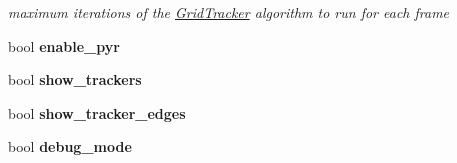 \begin{DoxyCompactItemize}
\begin{DoxyCompactList}\small\item\em maximum iterations of the \hyperlink{classGridTracker}{Grid\-Tracker} algorithm to run for each frame \end{DoxyCompactList}\item 
\hypertarget{structGridTrackerParams_a0516980c61b4f4915e44c54384cc9446}{bool {\bfseries enable\-\_\-pyr}}\label{structGridTrackerParams_a0516980c61b4f4915e44c54384cc9446}

\item 
\hypertarget{structGridTrackerParams_a965b5f1d03e9d7311a2e899ef8d41f13}{bool {\bfseries show\-\_\-trackers}}\label{structGridTrackerParams_a965b5f1d03e9d7311a2e899ef8d41f13}

\item 
\hypertarget{structGridTrackerParams_ae8bd52af8dfc1dc39c6b6247645a72ae}{bool {\bfseries show\-\_\-tracker\-\_\-edges}}\label{structGridTrackerParams_ae8bd52af8dfc1dc39c6b6247645a72ae}

\item 
\hypertarget{structGridTrackerParams_ae52fc0ee24d84c603b68f1da419bb731}{bool {\bfseries debug\-\_\-mode}}\label{structGridTrackerParams_ae52fc0ee24d84c603b68f1da419bb731}

\end{DoxyCompactItemize}


